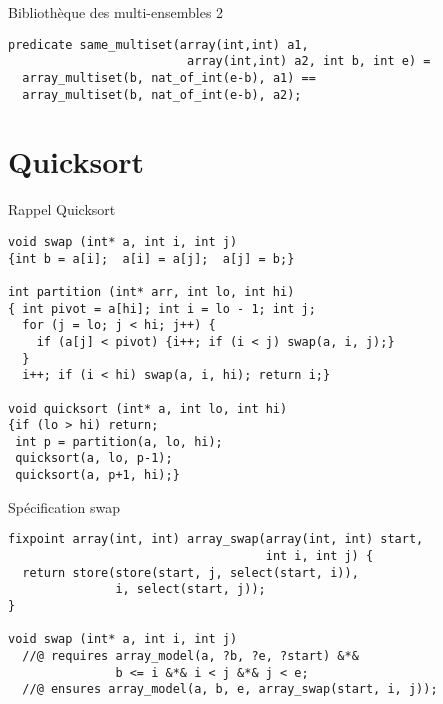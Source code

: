 \documentclass[]{beamer}
\begin{document}
\begin{frame}[fragile]{Biblioth\`eque des multi-ensembles 2}

	\begin{lstlisting}[basicstyle=\footnotesize]
predicate same_multiset(array(int,int) a1, 
                         array(int,int) a2, int b, int e) =
  array_multiset(b, nat_of_int(e-b), a1) == 
  array_multiset(b, nat_of_int(e-b), a2);
	\end{lstlisting}
\end{frame}

\section{Quicksort}

\begin{frame}
\tableofcontents[currentsection]
\end{frame}

\begin{frame}[fragile]{Rappel Quicksort}
\begin{lstlisting}[basicstyle=\footnotesize]
void swap (int* a, int i, int j)
{int b = a[i];  a[i] = a[j];  a[j] = b;}

int partition (int* arr, int lo, int hi)
{ int pivot = a[hi]; int i = lo - 1; int j;
  for (j = lo; j < hi; j++) {
    if (a[j] < pivot) {i++; if (i < j) swap(a, i, j);}
  }
  i++; if (i < hi) swap(a, i, hi); return i;}
  
void quicksort (int* a, int lo, int hi)
{if (lo > hi) return;
 int p = partition(a, lo, hi);
 quicksort(a, lo, p-1);
 quicksort(a, p+1, hi);}
		\end{lstlisting}

\end{frame}





\begin{frame}[fragile]{Sp\'ecification swap}
	\begin{lstlisting}[basicstyle=\footnotesize]
fixpoint array(int, int) array_swap(array(int, int) start,
                                    int i, int j) {
  return store(store(start, j, select(start, i)), 
               i, select(start, j));
}

void swap (int* a, int i, int j)
  //@ requires array_model(a, ?b, ?e, ?start) &*&
               b <= i &*& i < j &*& j < e;
  //@ ensures array_model(a, b, e, array_swap(start, i, j));
	\end{lstlisting}
	
\end{frame}
\end{document}
